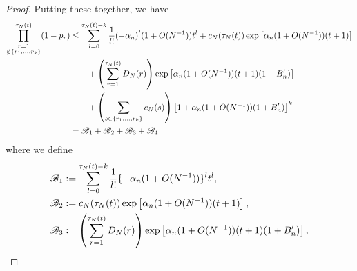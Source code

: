 \documentclass{article}
\newcommand{\1}[1]{\mathbbm{1}_{#1}}
\begin{document}
\begin{proof}
Putting these together, we have
\begin{align}
\prod_{\substack{r=1 \\ \notin \{r_1,\dots,r_k\} }}^{\tau_N(t)} (1-p_r)
&\leq \sum_{l=0}^{\tau_N(t) -k} \frac{1}{l!} (-\alpha_n)^l (1+O(N^{-1})) t^l
+ c_N(\tau_N(t)) \exp\left[ \alpha_n (1+O(N^{-1})) (t+1) \right] \notag\\
&\qquad+ \left( \sum_{r=1}^{\tau_N(t)} D_N(r) \right) \exp\left[ \alpha_n (1+O(N^{-1})) (t+1) (1+B_n^\prime) \right] \notag\\
&\qquad+ \left( \sum_{s\in \{r_1,\dots,r_k\} } c_N(s) \right)
\left[ 1 + \alpha_n (1+O(N^{-1})) (1 + B_n^\prime) \right]^k \notag\\
&= \mathscr{B}_1 + \mathscr{B}_2 + \mathscr{B}_3 + \mathscr{B}_4
\end{align}
where we define
\begin{align}
\mathscr{B}_1 &:= \sum_{l=0}^{\tau_N(t) -k} \frac{1}{l!} \{ - \alpha_n (1+O(N^{-1})) \}^l t^l , \notag\\
\mathscr{B}_2 &:= c_N(\tau_N(t)) \exp\left[ \alpha_n (1+O(N^{-1})) (t+1) \right] , \notag\\
\mathscr{B}_3 &:= \left( \sum_{r=1}^{\tau_N(t)} D_N(r) \right) \exp\left[ \alpha_n (1+O(N^{-1})) (t+1) (1+B_n^\prime) \right] , \notag\\

\end{align}
\end{proof}
\end{document}
